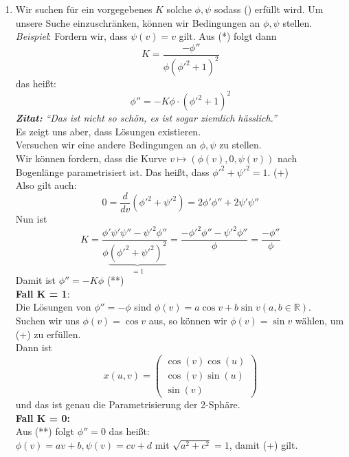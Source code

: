 \begin{solution}
\begin{enumerate}[label=(\alph*)]
  \item 
  Wir suchen für ein vorgegebenes \( K \) solche \( \phi, \psi \) sodass (\*) erfüllt wird. Um unsere Suche einzuschränken, können wir Bedingungen an \( \phi, \psi \) stellen. \\
  \emph{Beispiel}: Fordern wir, dass \( \psi(v) = v \) gilt. Aus (*) folgt dann 
  \begin{equation*}
    K = \frac{-\phi''}{\phi{(\phi'^2 + 1)}^2}
  \end{equation*} 
  das heißt:
  \begin{equation*}
    \phi'' = -K \phi \cdot {(\phi'^2 + 1)}^2
  \end{equation*} 
  \emph{\textbf{Zitat:}} \emph{``Das ist nicht so schön, es ist sogar ziemlich hässlich.''} \\
  Es zeigt uns aber, dass Lösungen existieren. \\
  Versuchen wir eine andere Bedingungen an \( \phi, \psi \) zu stellen. \\
  Wir können fordern, dass die Kurve \( v \mapsto (\phi(v), 0, \psi(v)) \) nach Bogenlänge parametrisiert ist. Das heißt, dass \( \phi'^2 + \psi'^2 = 1 \). (+)\\
  Also gilt auch:
  \begin{equation*}
    0 = \frac{d}{dv}(\phi'^2 + \psi'^2) = 2 \phi'\phi'' + 2 \psi' \psi''
  \end{equation*}
  Nun ist 
  \begin{equation*}
    K = \frac{\phi' \psi' \psi'' - \psi'^2 \phi''}{\phi\underbrace{{(\phi'^2 + \psi'^2)}^2}_{= 1}} = \frac{-\phi'^2 \phi'' - \psi'^2 \phi''}{\phi} = \frac{-\phi''}{\phi}
  \end{equation*}
  Damit ist \( \phi'' = -K \phi \) (**) \\
  \textbf{Fall K = 1}: \\
  Die Lösungen von \( \phi'' = - \phi \) sind \( \phi(v) = a \cos v + b \sin v (a,b \in \mathbb{R}) \). \\
  Suchen wir uns \( \phi(v) = \cos v \) aus, so können wir \( \phi(v) = \sin v \) wählen, um (+) zu erfüllen. \\
  Dann ist
  \begin{equation*}
    x(u,v) = \begin{pmatrix}
      \cos(v) \cos(u) \\
      \cos(v) \sin(u) \\
      \sin(v) 
    \end{pmatrix}
  \end{equation*}
  und das ist genau die Parametrisierung der 2-Sphäre. \\
  \textbf{Fall K = 0:} \\
  Aus (**) folgt \( \phi'' = 0 \) das heißt: \\
  \( \phi(v) = av + b, \psi(v) = cv + d \) mit \( \sqrt{ a^2 + c^2} = 1 \), damit (+) gilt. \\
  

\end{enumerate}
\end{solution}
